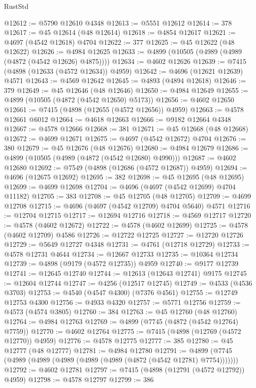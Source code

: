 \begin{lexlean}{RustStd}
\begin{coremodule}
@12612 := @5790 @12610 @4348
@12613 := @5551 @12612
@12614 := 378
@12617 := @45 @12614 (@48 @12614)
@12618 := @4854 @12617
@12621 := @4697 (@4542 @12618) @4704
@12622 := 377
@12625 := @45 @12622 (@48 @12622)
@12626 := @4984 @12625
@12633 := @4899 (@10505 (@4989 (@4989 (@4872 (@4542 @12626) @4875))))
@12634 := @4602 @12626
@12639 := @7415 (@4898 (@12633 (@4572 @12634)) @4959)
@12642 := @4696 (@12621 @12639) @4571
@12643 := @4569 @12642
@12645 := @4893 (@4894 @12618)
@12646 := 379
@12649 := @45 @12646 (@48 @12646)
@12650 := @4984 @12649
@12655 := @4899 (@10505 (@4872 (@4542 @12650) @5173))
@12656 := @4602 @12650
@12661 := @7415 (@4898 (@12655 (@4572 @12656)) @4959)
@12663 := @4578 @12661 @6012
@12664 := @4618 @12663
@12666 := @9182 @12664 @4348
@12667 := @4578 @12666
@12668 := 381
@12671 := @45 @12668 (@48 @12668)
@12672 := @4699 @12671
@12675 := @4697 (@4542 @12672) @4704
@12676 := 380
@12679 := @45 @12676 (@48 @12676)
@12680 := @4984 @12679
@12686 := @4899 (@10505 (@4989 (@4872 (@4542 @12680) @4990)))
@12687 := @4602 @12680
@12692 := @7549 (@4898 (@12686 (@4572 @12687)) @4959)
@12694 := @4696 (@12675 @12692)
@12695 := 382
@12698 := @45 @12695 (@48 @12695)
@12699 := @4699 @12698
@12704 := @4696 (@4697 (@4542 @12699) @4704 @11182)
@12705 := 383
@12708 := @45 @12705 (@48 @12705)
@12709 := @4699 @12708
@12715 := @4696 (@4697 (@4542 @12709) @4704 @5640) @4571
@12716 := @12704 @12715
@12717 := @12694 @12716
@12718 := @4569 @12717
@12720 := @4578 (@4602 @12672)
@12722 := @4578 (@4602 @12699)
@12725 := @4578 (@4602 @12709) @4586
@12726 := @12722 @12725
@12727 := @12720 @12726
@12729 := @5649 @12727 @4348
@12731 := @4761 (@12718 @12729)
@12733 := @4578 @12731 @4644
@12734 := @12667 @12733
@12735 := @10364 @12734
@12739 := @4898 (@9179 (@4572 @12735)) @4959
@12740 := @9177 @12739
@12741 := @12645 @12740
@12744 := @12613 (@12643 @12741) @9175
@12745 := @12604 @12744
@12747 := @4256 (@12517 @12745)
@12749 := @4533 (@4536 @3703)
@12753 := @4540 (@4547 @4300) (@7376 @4561)
@12755 := @12749 @12753 @4300
@12756 := @4933 @4320
@12757 := @5771 @12756
@12759 := @4573 (@4574 @3805)
@12760 := 384
@12763 := @45 @12760 (@48 @12760)
@12764 := @4984 @12763
@12769 := @4899 (@7745 (@4872 (@4542 @12764) @7759))
@12770 := @4602 @12764
@12775 := @7415 (@4898 (@12769 (@4572 @12770)) @4959)
@12776 := @4578 @12775
@12777 := 385
@12780 := @45 @12777 (@48 @12777)
@12781 := @4984 @12780
@12791 := @4899 (@7745 (@4989 (@4989 (@4989 (@4989 (@4989 (@4872 (@4542 @12781) @7754)))))))
@12792 := @4602 @12781
@12797 := @7415 (@4898 (@12791 (@4572 @12792)) @4959)
@12798 := @4578 @12797
@12799 := 386

\end{coremodule}
\end{lexlean}
